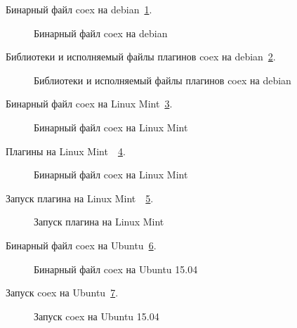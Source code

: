 Бинарный файл coex на debian~\ref{debian:debian}.

\begin{figure}[h!]
\caption{ Бинарный файл coex на debian}
\label{debian:debian}
\end{figure}

Библиотеки и исполняемый файлы плагинов coex на debian~\ref{debian2:debian2}.

\begin{figure}[h!]
\caption{ Библиотеки и исполняемый файлы плагинов coex на debian}
\label{debian2:debian2}
\end{figure}

Бинарный файл coex на Linux Mint~\ref{Linux Mint:Linux Mint}.

\begin{figure}[h!]
\caption{ Бинарный файл coex на Linux Mint}
\label{Linux Mint:Linux Mint}
\end{figure}

Плагины на Linux Mint~~\ref{Plugins:Plugins}.

\begin{figure}[h!]
\caption{ Бинарный файл coex на Linux Mint}
\label{Plugins:Plugins}
\end{figure}

Запуск плагина на Linux Mint~~\ref{Zapusk:Zapusk}.

\begin{figure}[h!]
\caption{ Запуск плагина на Linux Mint}
\label{Zapusk:Zapusk}
\end{figure}

\cite{deb_package_howto} 
\cite{deb_man} 


Бинарный файл coex на Ubuntu~\ref{ubuntu:ubuntu}.

\begin{figure}[h!]
\caption{ Бинарный файл coex на Ubuntu 15.04 }
\label{ubuntu:ubuntu}
\end{figure}

Запуск coex на Ubuntu~\ref{ubuntu2:ubuntu2}.

\begin{figure}[h!]
\caption{ Запуск coex на Ubuntu 15.04 }
\label{ubuntu2:ubuntu2}
\end{figure}


\clearpage











